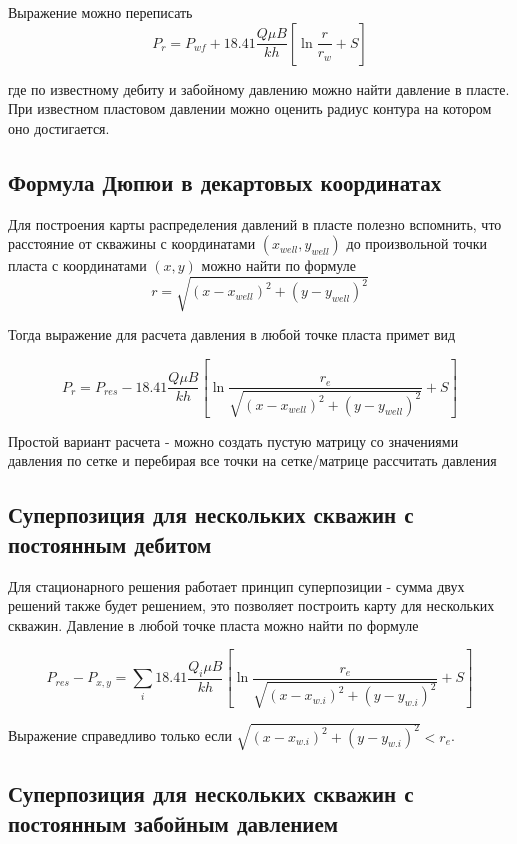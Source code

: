 \documentclass[a4paper,12pt]{article}
\begin{document}
	Выражение можно переписать 
	\begin{equation}
	P_{r} = P_{wf} + 18.41\dfrac{ Q\mu B }{kh} \left[ \ln\dfrac{r}{r_w} +S \right]
	\end{equation}
	
	где по известному дебиту и забойному давлению можно найти давление в пласте. При известном пластовом давлении можно оценить радиус контура на котором оно достигается.
	
	\subsection{Формула Дюпюи в декартовых координатах}
	Для построения карты распределения давлений в пласте полезно вспомнить, что расстояние от скважины с координатами $(x_{well}, y_{well})$ до произвольной точки пласта с координатами $(x,y)$ можно найти по формуле 
	$$r=\sqrt{ (x-x_{well})^2 + (y-y_{well})^2 }$$
	
	Тогда выражение для расчета давления в любой точке пласта примет вид
	
	\begin{equation}
		P_{r} = P_{res} - 18.41\dfrac{ Q\mu B }{kh} \left[ \ln\dfrac{r_e}{\sqrt{ (x-x_{well})^2 + (y-y_{well})^2 }} +S \right]
	\end{equation}
	
	Простой вариант расчета  - можно создать пустую матрицу со значениями давления по сетке и перебирая все точки на сетке/матрице рассчитать давления
	
	\subsection{Суперпозиция для нескольких скважин с постоянным дебитом} 
	
	Для стационарного решения работает принцип суперпозиции - сумма двух решений также будет решением, это позволяет построить карту для нескольких скважин.
	Давление в любой точке пласта можно найти по формуле
	
	\begin{equation}
	P_{res} - P_{x,y} =  \sum_{i} 18.41\dfrac{ Q_i\mu B }{kh} \left[ \ln\frac{r_e}{\sqrt{ (x-x_{w.i})^2 + (y-y_{w.i})^2 }} +S \right]
	\end{equation}
	
	Выражение справедливо только если $\sqrt{ (x-x_{w.i})^2 + (y-y_{w.i})^2 }< r_e$.
	
	\subsection{Суперпозиция для нескольких скважин с постоянным забойным давлением}
	
\end{document}
